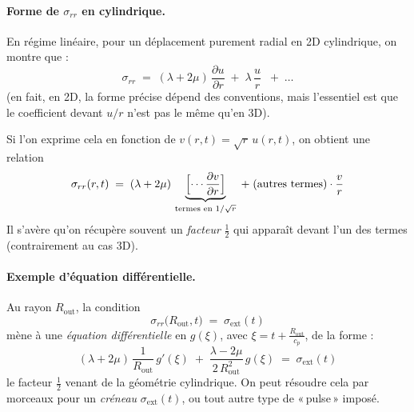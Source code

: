 \documentclass[10pt]{book}
\begin{document}
\paragraph{Forme de \texorpdfstring{$\sigma_{rr}$}{sigma\_rr} en cylindrique.}
En régime linéaire, pour un déplacement purement radial en 2D cylindrique, on montre que :
$$\sigma_{rr} \;=\; (\lambda + 2\mu)\,\frac{\partial u}{\partial r} \;+\; \lambda\,\frac{u}{r} \;\;+\;\dots$$
(en fait, en 2D, la forme précise dépend des conventions, mais l’essentiel est que le coefficient devant $u/r$ n’est pas le même qu’en 3D).  

Si l’on exprime cela en fonction de $v(r,t) = \sqrt{r}\,u(r,t)$, on obtient une relation
$$\sigma_{rr}(r,t) \;=\; (\lambda + 2\mu)\,\underbrace{\Bigl[\cdots \frac{\partial v}{\partial r}\Bigr]}_{\text{termes en }1/\sqrt{r}} \;+\; \text{(autres termes)}\cdot \frac{v}{r}$$
Il s’avère qu’on récupère souvent un \emph{facteur} $\tfrac12$ qui apparaît devant l’un des termes (contrairement au cas 3D).  

\paragraph{Exemple d’équation différentielle.}
Au rayon $R_{\text{out}}$, la condition 
$$\sigma_{rr}\bigl(R_{\text{out}},t\bigr) \;=\; \sigma_{\text{ext}}(t)$$
mène à une \emph{équation différentielle} en $g(\xi)$, avec $\xi = t + \tfrac{R_{\text{out}}}{c_p}$, de la forme :
$$(\lambda + 2\mu)\,\frac{1}{R_{\text{out}}}\,g'(\xi) \;+\; \frac{\lambda - 2\mu}{2\,R_{\text{out}}^{2}}\,g(\xi) \;=\; \sigma_{\text{ext}}(t)$$
le facteur \(\tfrac12\) venant de la géométrie cylindrique. On peut résoudre cela par morceaux pour un \emph{créneau} $\sigma_{\text{ext}}(t)$, ou tout autre type de «\,pulse\,» imposé.
\end{document}
